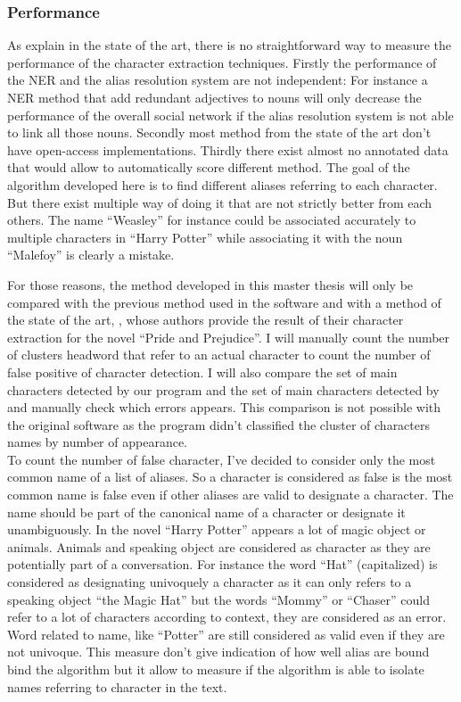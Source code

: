 \documentclass[a4paper, 12pt]{report}
\begin{document}
\subsubsection{Performance}
\label{performance}
As explain in the state of the art, there is no straightforward way to measure the performance of the character extraction techniques. Firstly the performance of the NER and the alias resolution system are not independent: For instance a NER method that add redundant adjectives to nouns will only decrease the performance of the overall social network if the alias resolution system is not able to link all those nouns. Secondly most method from the state of the art don't have open-access implementations. Thirdly there exist almost no annotated data that would allow to automatically score different method. The goal of the algorithm developed here is to find different aliases referring to each character. But there exist multiple way of doing it that are not strictly better from each others. The name ``Weasley'' for instance could be associated accurately to multiple characters in ``Harry Potter'' while associating it with the noun ``Malefoy'' is clearly a mistake.

For those reasons, the method developed in this master thesis will only be compared with the previous method used in the software \citep{original} and with a method of the state of the art, \cite{character_meta},  whose authors provide the result of their character extraction for the novel ``Pride and Prejudice''. I will manually count the number of clusters headword that refer to an actual character to count the number of false positive of character detection. I will also compare the set of main characters detected by our program and the set of main characters detected by \cite{character_meta} and manually check which errors appears. This comparison is not possible with the original software as the program didn't classified the cluster of characters names by number of appearance.\\


To count the number of  false character, I've decided to consider only the most common name of a list of aliases. So a character is considered as false is the most common name is false even if other aliases are valid to designate a character. The name should be part of the canonical name of a character or designate it unambiguously. In the novel ``Harry Potter'' appears a lot of magic object or animals. Animals and speaking object are considered as character as they are potentially part of a conversation. For instance the word ``Hat'' (capitalized) is considered as designating univoquely  a character as it can only refers to a speaking object ``the Magic Hat'' but the words ``Mommy'' or ``Chaser'' could refer to a lot of characters according to context, they are considered as an error. Word related to name, like ``Potter'' are still considered as valid even if they are not univoque. This measure don't give indication of how well alias are bound bind the algorithm but it allow to measure if the algorithm is able to isolate names referring to character in the text. 
\end{document}
